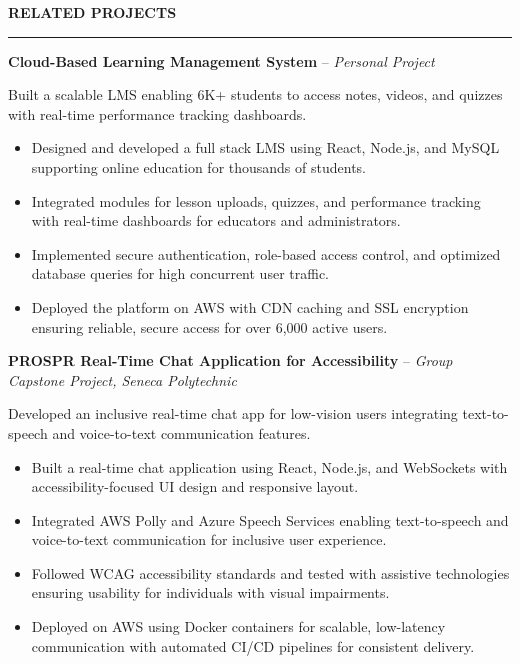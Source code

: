 \documentclass[10pt,letterpaper]{article}
\begin{document}
\vspace{6pt}

\textbf{RELATED PROJECTS}\\[-8pt]
\noindent\rule{\textwidth}{1pt}

\vspace{-2pt}

\textbf{Cloud-Based Learning Management System} -- \emph{Personal Project}

\vspace{-1pt}

Built a scalable LMS enabling 6K+ students to access notes, videos, and quizzes with real-time performance tracking dashboards.
\vspace{-1pt}
\begin{itemize}
\item Designed and developed a full stack LMS using React, Node.js, and MySQL supporting online education for thousands of students.
\item Integrated modules for lesson uploads, quizzes, and performance tracking with real-time dashboards for educators and administrators.
\item Implemented secure authentication, role-based access control, and optimized database queries for high concurrent user traffic.
\item Deployed the platform on AWS with CDN caching and SSL encryption ensuring reliable, secure access for over 6,000 active users.
\end{itemize}

\textbf{PROSPR  Real-Time Chat Application for Accessibility} -- \emph{Group Capstone Project, Seneca Polytechnic}

\vspace{-1pt}

Developed an inclusive real-time chat app for low-vision users integrating text-to-speech and voice-to-text communication features.
\vspace{-1pt}
\begin{itemize}
\item Built a real-time chat application using React, Node.js, and WebSockets with accessibility-focused UI design and responsive layout.
\item Integrated AWS Polly and Azure Speech Services enabling text-to-speech and voice-to-text communication for inclusive user experience.
\item Followed WCAG accessibility standards and tested with assistive technologies ensuring usability for individuals with visual impairments.
\item Deployed on AWS using Docker containers for scalable, low-latency communication with automated CI/CD pipelines for consistent delivery.
\end{itemize}
\end{document}
